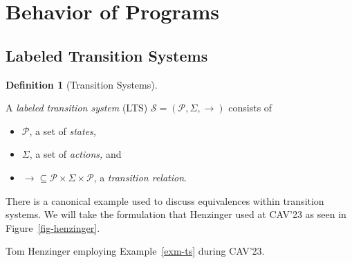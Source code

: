 \documentclass[
  a4paper,
]{report}
\providecommand{\tightlist}{%
  \setlength{\itemsep}{0pt}\setlength{\parskip}{0pt}}\usepackage{longtable,booktabs,array}
\theoremstyle{plain}
\theoremstyle{plain}
\theoremstyle{definition}
\newtheorem{definition}{Definition}[section]
\theoremstyle{plain}
\theoremstyle{definition}
\theoremstyle{remark}
\begin{document}
\section{Behavior of Programs}\label{behavior-of-programs}

\subsection{Labeled Transition
Systems}\label{labeled-transition-systems}

\begin{definition}[Transition
Systems]\protect\hypertarget{def-ts}{}\label{def-ts}

A \emph{labeled transition system} (LTS)
\(\mathcal{S}=(\mathcal{P},\Sigma,\xrightarrow{})\) consists of

\begin{itemize}
\tightlist
\item
  \(\mathcal{P}\), a set of \emph{states,}
\item
  \(\Sigma\), a set of \emph{actions,} and
\item
  \({\xrightarrow{}} ⊆ \mathcal{P}× \Sigma× \mathcal{P}\), a
  \emph{transition relation}.
\end{itemize}

\end{definition}

\noindent  There is a canonical example used to discuss equivalences
within transition systems. We will take the formulation that Henzinger
used at CAV'23 as seen in Figure~\ref{fig-henzinger}.

\begin{marginfigure}


\caption{\label{fig-henzinger}Tom Henzinger employing
Example~\ref{exm-ts} during CAV'23.}

\end{marginfigure}%
\end{document}
